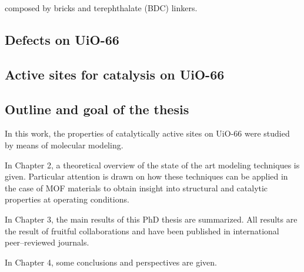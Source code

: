  composed by  bricks and terephthalate (BDC) linkers.

\subsection*{Defects on UiO-66}

\subsection*{Active sites for catalysis on UiO-66}


\subsection*{Outline and goal of the thesis}
In this work, the properties of catalytically active sites on UiO-66 were studied by means of molecular modeling. 

In Chapter 2, a theoretical overview of the state of the art modeling techniques is given. Particular attention is drawn on how these techniques can be applied in the case of MOF materials to obtain insight into structural and catalytic properties at operating conditions.

In Chapter 3, the main results of this PhD thesis are summarized. All results are the result of fruitful collaborations and have been published in international peer--reviewed journals. 

In Chapter 4, some conclusions and perspectives are given.







